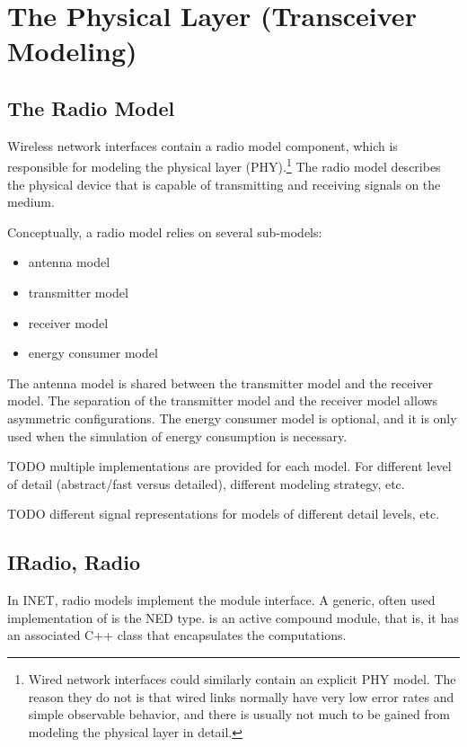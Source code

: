 \chapter{The Physical Layer (Transceiver Modeling)}
\label{cha:physicallayer}

\section{The Radio Model}

Wireless network interfaces contain a radio model component, which is
responsible for modeling the physical layer (PHY).\footnote{Wired network interfaces
could similarly contain an explicit PHY model. The reason they do not is that
wired links normally have very low error rates and simple observable behavior,
and there is usually not much to be gained from modeling the physical layer in detail.}
The radio model describes the physical device that is capable of transmitting
and receiving signals on the medium. 

Conceptually, a radio model relies on several sub-models:

\begin{itemize}
  \item antenna model
  \item transmitter model 
  \item receiver model
  \item energy consumer model 
\end{itemize}

The antenna model is shared between the transmitter model and the receiver model.
The separation of the transmitter model and the receiver model allows 
asymmetric configurations. The energy consumer model is optional, and 
it is only used when the simulation of energy consumption is necessary.

TODO multiple implementations are provided for each model. For different
level of detail (abstract/fast versus detailed), different modeling strategy, etc.

TODO different signal representations for models of different detail levels, etc.

\section{IRadio, Radio}

In INET, radio models implement the  module interface. 
A generic, often used implementation of  is the 
 NED type.  is an active compound module, 
that is, it has an associated C++ class that encapsulates the computations.

